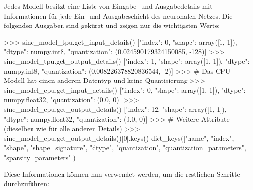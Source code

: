 Jedes Modell besitzt eine Liste von Eingabe- und Ausgabedetails
mit Informationen für jede Ein- und Ausgabeschicht des neuronalen Netzes.
Die folgenden Ausgaben sind gekürzt und zeigen nur die wichtigsten Werte:
\begin{pyconcode}
>>> sine_model_tpu.get_input_details()
[{"index": 0,
  "shape": array([1, 1]),
  "dtype": numpy.int8,
  "quantization": (0.024590179324150085, -128)}]
>>> sine_model_tpu.get_output_details()
[{"index": 1,
  "shape": array([1, 1]),
  "dtype": numpy.int8,
  "quantization": (0.008226378820836544, -2)}]
>>> # Das CPU-Modell hat einen anderen Datentyp und keine Quantisierung
>>> sine_model_cpu.get_input_details()
[{"index": 0,
  "shape": array([1, 1]),
  "dtype": numpy.float32,
  "quantization": (0.0, 0)}]
>>> sine_model_cpu.get_output_details()
[{"index": 12,
  "shape": array([1, 1]),
  "dtype": numpy.float32,
  "quantization": (0.0, 0)}]
>>> # Weitere Attribute (dieselben wie für alle anderen Details)
>>> sine_model_cpu.get_output_details()[0].keys()
dict_keys(["name", "index", "shape", "shape_signature", "dtype",
           "quantization", "quantization_parameters", "sparsity_parameters"])
\end{pyconcode}
Diese Informationen können nun verwendet werden, um die
restlichen Schritte durchzuführen:
